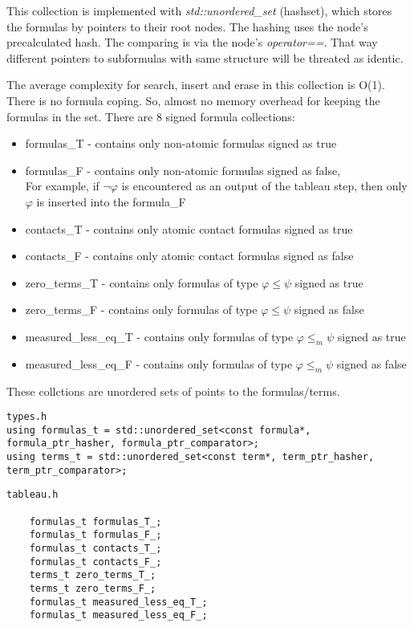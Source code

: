 \documentclass{article}
\begin{document}
	This collection is implemented with \textit{std::unordered\_set} (hashset), which stores the formulas by pointers to their root nodes. The hashing uses the node's precalculated hash. The comparing is via the node's \textit{operator==}. That way different pointers to subformulas with same structure will be threated as identic.

	The average complexity for search, insert and erase in this collection is O(1). There is no formula coping. So, almost no memory overhead for keeping the formulas in the set.
	\newline
	\newline
	There are 8 signed formula collections:
	\begin{itemize}
		\item formulas\_T - contains only non-atomic formulas signed as true
		\item formulas\_F - contains only non-atomic formulas signed as false, \\
				For example, if $\neg\varphi$ is encountered as an output of the tableau step, then only $\varphi$ is inserted into the formula\_F
		\item contacts\_T - contains only atomic contact formulas signed as true
		\item contacts\_F - contains only atomic contact formulas signed as false
		\item zero\_terms\_T - contains only formulas of type $\varphi \le \psi$ signed as true
		\item zero\_terms\_F - contains only formulas of type $\varphi \le \psi$ signed as false
		\item measured\_less\_eq\_T - contains only formulas of type $\varphi \le_m \psi$ signed as true
		\item measured\_less\_eq\_F - contains only formulas of type $\varphi \le_m \psi$ signed as false
	\end{itemize}

	These collctions are unordered sets of points to the formulas/terms.

\begin{lstlisting}
types.h
using formulas_t = std::unordered_set<const formula*, formula_ptr_hasher, formula_ptr_comparator>;
using terms_t = std::unordered_set<const term*, term_ptr_hasher, term_ptr_comparator>;
\end{lstlisting}

\begin{lstlisting}
tableau.h

    formulas_t formulas_T_;
    formulas_t formulas_F_;
    formulas_t contacts_T_;
    formulas_t contacts_F_;
    terms_t zero_terms_T_;
    terms_t zero_terms_F_;
    formulas_t measured_less_eq_T_;
    formulas_t measured_less_eq_F_;
\end{lstlisting}
\end{document}
